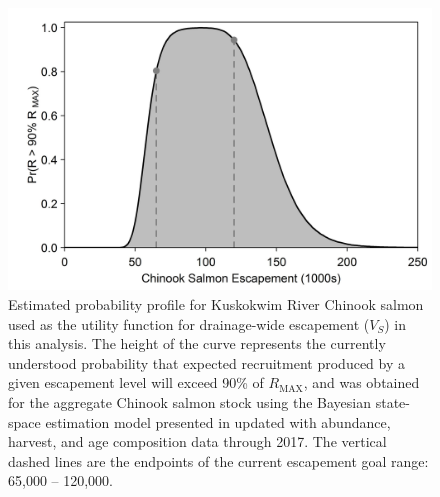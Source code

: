 \documentclass[12pt,]{book}
\theoremstyle{definition}
\theoremstyle{definition}
\theoremstyle{definition}
\theoremstyle{remark}
\begin{document}
\begin{singlespace}
\begin{figure}
  \centering
  \includegraphics{img/Ch3/R-max-profile.jpg}
  \caption{Estimated probability profile for Kuskokwim River Chinook salmon used as the utility function for drainage-wide escapement ($V_S$) in this analysis. The height of the curve represents the currently understood probability that expected recruitment produced by a given escapement level will exceed 90\% of $R_{\text{MAX}}$, and was obtained for the aggregate Chinook salmon stock using the Bayesian state-space estimation model presented in \cite{hamazaki-etal-2012} updated with abundance, harvest, and age composition data through 2017. The vertical dashed lines are the endpoints of the current escapement goal range: 65,000 -- 120,000.}
  \label{fig:R-max-profile}
\end{figure}


\end{singlespace}
\end{document}
